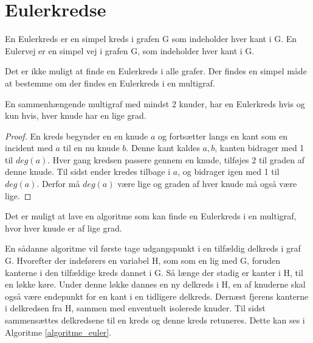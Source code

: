 \section{Eulerkredse}

\begin{defn}\label{euler_def}
En Eulerkreds er en simpel kreds i grafen G som indeholder hver kant i G.
En Eulervej er en simpel vej i grafen G, som indeholder hver kant i G.  
\end{defn}

\noindent Det er ikke muligt at finde en Eulerkreds i alle grafer. 
Der findes en simpel måde at bestemme om der findes en Eulerkreds i en multigraf. 

\begin{thm}\label{Euler_multigraf}
En sammenhængende multigraf med mindst 2 knuder, har en Eulerkreds hvis og kun hvis, hver knude har en lige grad.
\end{thm}

\begin{proof} 
En kreds begynder en en knude $a$ og fortsætter langs en kant som en incident med $a$ til en nu knude $b$. 
Denne kant kaldes ${a,b}$, kanten bidrager med 1 til $deg(a)$. 
Hver gang kredsen passere gennem en knude, tilføjes 2 til graden af denne knude. 
Til sidst ender kredes tilbage i $a$, og bidrager igen med 1 til $deg(a)$. 
Derfor må $deg(a)$ være lige og graden af hver knude må også være lige.  
\end{proof} 

\noindent Det er muligt at lave en algoritme som kan finde en Eulerkreds i en multigraf, hvor hver knude er af lige grad.

En sådanne algoritme vil første tage udgangspunkt i en tilfældig delkreds i graf G. 
Hvorefter der indeførers en variabel H, som som en lig med G, foruden kanterne i den tilfældige kreds dannet i G. 
Så længe der stadig er kanter i H, til en løkke køre. 
Under denne løkke dannes en ny delkreds i H, en af knuderne skal også være endepunkt for en kant i en tidligere delkreds.
Dernæst fjerens kanterne i delkredsen fra H, sammen med enventuelt isolerede knuder. 
Til sidst sammensættes delkredsene til en kreds og denne kreds retuneres.
Dette kan ses i Algoritme \ref{algoritme_euler}.  

